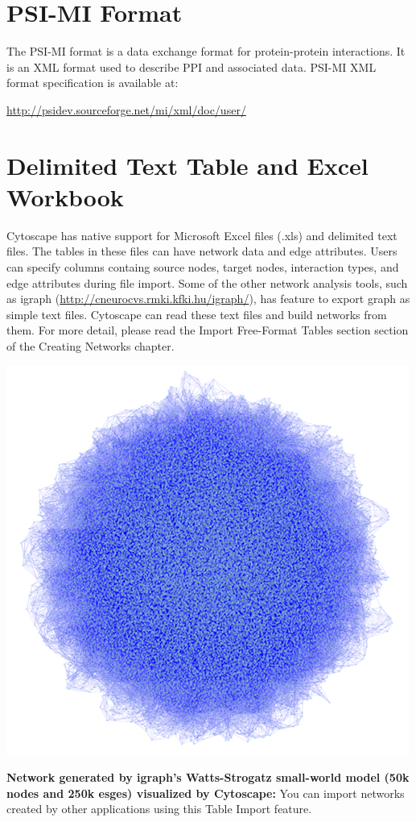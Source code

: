  
\section{PSI-MI Format}


 The PSI-MI format is a data exchange format for protein-protein interactions. It is an XML format used to describe PPI and associated data. PSI-MI XML format specification is available at: 


 \url{http://psidev.sourceforge.net/mi/xml/doc/user/}


 
\section{Delimited Text Table and Excel Workbook}


 Cytoscape has native support for Microsoft Excel files (.xls) and delimited text files. The tables in these files can have network data and edge attributes. Users can specify columns containg source nodes, target nodes, interaction types, and edge attributes during file import. Some of the other network analysis tools, such as igraph (\url{http://cneurocvs.rmki.kfki.hu/igraph/}), has feature to export graph as simple text files. Cytoscape can read these text files and build networks from them. For more detail, please read the Import Free-Format Tables section section of the Creating Networks chapter. 

\centerline{\includegraphics[width=.7\textwidth]{images/huge_network_igraph.png}}

 \textbf{Network generated by igraph's Watts-Strogatz small-world model (50k nodes and 250k esges) visualized by Cytoscape:}
 You can import networks created by other applications using this Table Import feature. 
 
